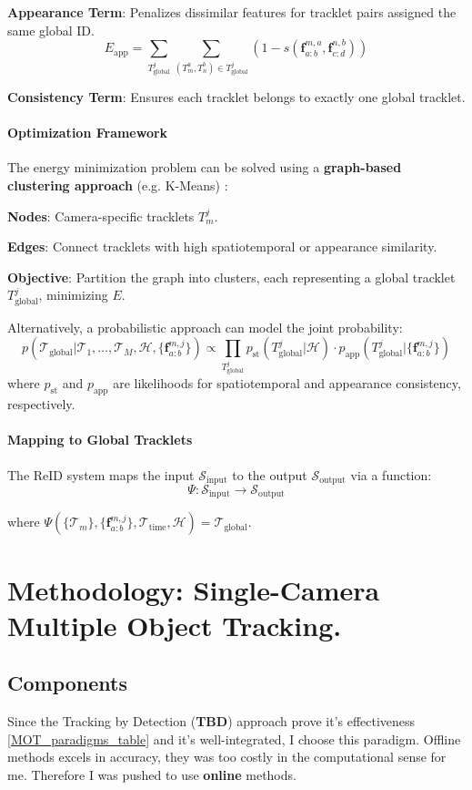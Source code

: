 \documentclass[12pt, a4paper]{article}
\begin{document}
  \textbf{Appearance Term}: Penalizes dissimilar features for tracklet pairs assigned the same global ID.
  \[
  E_{\text{app}} = \sum_{T^j_{\text{global}}} \sum_{(T_m^a, T_n^b) \in T^j_{\text{global}}} (1 - s(\mathbf{f}_{a:b}^{m,a}, \mathbf{f}_{c:d}^{n,b}))
  \]
  
  \textbf{Consistency Term}: Ensures each tracklet belongs to exactly one global tracklet.
  
\paragraph{Optimization Framework}
The energy minimization problem can be solved using a \textbf{graph-based clustering approach} (e.g. K-Means) :

 \textbf{Nodes}: Camera-specific tracklets $T_m^j$.

 \textbf{Edges}: Connect tracklets with high spatiotemporal or appearance similarity.

 \textbf{Objective}: Partition the graph into clusters, each representing a global tracklet $T^j_{\text{global}}$, minimizing $E$.

Alternatively, a probabilistic approach can model the joint probability:
\[
p(\mathcal{T}_{\text{global}} | \mathcal{T}_1, \ldots, \mathcal{T}_M, \mathcal{H}, \{\mathbf{f}_{a:b}^{m,j}\}) \propto \prod_{T^j_{\text{global}}} p_{\text{st}}(T^j_{\text{global}} | \mathcal{H}) \cdot p_{\text{app}}(T^j_{\text{global}} | \{\mathbf{f}_{a:b}^{m,j}\})
\]
where $p_{\text{st}}$ and $p_{\text{app}}$ are likelihoods for spatiotemporal and appearance consistency, respectively.

\paragraph{Mapping to Global Tracklets}
The ReID system maps the input $\mathcal{S}_{\text{input}}$ to the output $\mathcal{S}_{\text{output}}$ via a function:
\[
\Psi: \mathcal{S}_{\text{input}} \to \mathcal{S}_{\text{output}}
\]

where $\Psi(\{\mathcal{T}_m\}, \{\mathbf{f}_{a:b}^{m,j}\}, \mathcal{T}_{\text{time}}, \mathcal{H}) = \mathcal{T}_{\text{global}}$. 


\section{Methodology: Single-Camera Multiple Object Tracking.}

\subsection{Components}
Since the Tracking by Detection (\textbf{TBD}) approach prove it’s effectiveness \ref{MOT_paradigms_table} and it's well-integrated, I choose this paradigm. Offline methods excels in accuracy, they was too costly in the computational sense for me. Therefore I was pushed to use \textbf{online} methods. 
\end{document}
